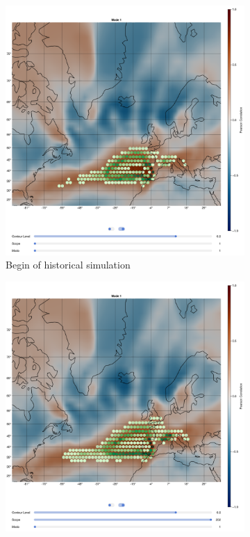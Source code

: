 \begin{figure}[!htb]
  \begin{subfigure}[b]{0.32\textwidth}
    \includegraphics[width=\textwidth]{figures/ivt_pr_cor_mode1_historical_hexbin.png}
    \caption{Begin of historical simulation}
    \label{fig:ivt eof pr cor historical mode1}
  \end{subfigure}
  \hfill
  \begin{subfigure}[b]{0.32\textwidth}
    \includegraphics[width=\textwidth]{figures/ivt_pr_cor_mode1_ssp126_hexbin.png}

\end{subfigure}
\end{figure}
